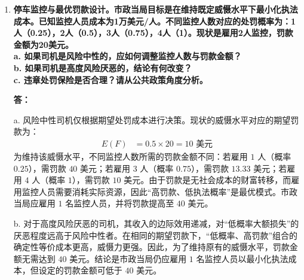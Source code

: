 \begin{enumerate}[label=\textbf{\arabic*.}, leftmargin=*]
\begin{center}
		\end{center}
		\newpage
		
		\item \textbf{停车监控与最优罚款设计。市政当局目标是在维持既定威慑水平下最小化执法成本。已知监控人员成本为1万美元/人。不同监控人数对应的处罚概率为：1人（0.25），2人（0.5），3人（0.75），4人（1）。现状是雇用2人监控，罚款金额为20美元。\\ a. 如果司机是风险中性的，应如何调整监控人数与罚款金额？\\ b. 如果司机是高度风险厌恶的，结论有何改变？\\ c. 违章处罚保险是否合理？请从公共政策角度分析。}
		
		\textbf{答：}
		
		a. 风险中性司机仅根据期望处罚成本进行决策。现状的威慑水平对应的期望罚款为：
		\[
		\begin{aligned}
			E(F) &= 0.5 \times 20 = 10 \text{ 美元}
		\end{aligned}
		\]
		为维持该威慑水平，不同监控人数所需的罚款金额不同：若雇用 $1$ 人（概率 $0.25$），需罚款 $40$ 美元；若雇用 $3$ 人（概率 $0.75$），需罚款 $13.33$ 美元；若雇用 $4$ 人（概率 $1$），需罚款 $10$ 美元。由于罚款是无社会成本的财富转移，而雇用监控人员需要消耗实际资源，因此“高罚款、低执法概率”是最优模式。市政当局应雇用 $1$ 名监控人员，并将罚款提高至 $40$ 美元。
		
		b. 对于高度风险厌恶的司机，其收入的边际效用递减，对“低概率大额损失”的厌恶程度远高于风险中性者。在相同的期望罚款下，“低概率、高罚款”组合的确定性等价成本更高，威慑力更强。因此，为了维持原有的威慑水平，罚款金额无需达到 $40$ 美元。结论是市政当局仍应雇用 $1$ 名监控人员以最小化执法成本，但设定的罚款金额可低于 $40$ 美元。
		

\end{enumerate}
